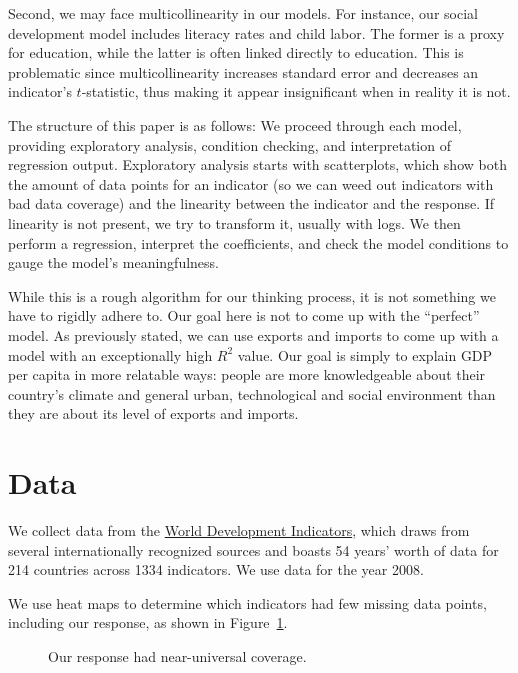 \documentclass[12pt]{article}
\begin{document}
Second, we may face multicollinearity in our models. For instance, our social development model includes literacy rates and child labor. The former is a proxy for education, while the latter is often linked directly to education. This is problematic since multicollinearity increases standard error and decreases an indicator's $t$-statistic, thus making it appear insignificant when in reality it is not.

The structure of this paper is as follows: We proceed through each model, providing exploratory analysis, condition checking, and interpretation of regression output. Exploratory analysis starts with scatterplots, which show both the amount of data points for an indicator (so we can weed out indicators with bad data coverage) and the linearity between the indicator and the response. If linearity is not present, we try to transform it, usually with logs. We then perform a regression, interpret the coefficients, and check the model conditions to gauge the model's meaningfulness.

While this is a rough algorithm for our thinking process, it is not something we have to rigidly adhere to. Our goal here is not to come up with the ``perfect'' model. As previously stated, we can use exports and imports to come up with a model with an exceptionally high $R^2$ value. Our goal is simply to explain GDP per capita in more relatable ways: people are more knowledgeable about their country's climate and general urban, technological and social environment than they are about its level of exports and imports.


\section{Data}
We collect data from the \href{http://data.worldbank.org/indicator}{World Development Indicators}, 
which draws from several internationally recognized sources and boasts 54 years' worth of data for 214 countries across 1334 indicators.
We use data for the year 2008.\endnotemark[1]

We use heat maps to determine which indicators had few missing data points, including our response, as shown in Figure~\ref{gdp_per_capita_heat_map}.

\begin{figure}[h!]
\centering
\caption{\label{gdp_per_capita_heat_map}Our response had near-universal coverage.}
\end{figure}
\end{document}
